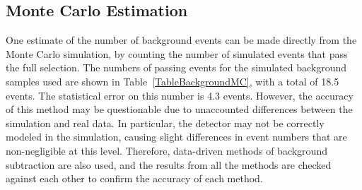 

\subsection{Monte Carlo Estimation}
\label{anMeth:BGSubMC}
One estimate of the number of background events can be made 
directly from the Monte Carlo simulation, 
by counting the number of simulated events that pass 
the full selection.  
The numbers of passing events for the simulated background 
samples used are shown in Table~\ref{TableBackgroundMC}, 
with a total of 18.5 events.  
The statistical error on this number is 4.3 events.  
However, the accuracy of this method may be questionable due to 
unaccounted differences between the simulation and real data. %
In particular, 
the detector may not be correctly modeled in the simulation, 
causing slight differences in event numbers 
that are non-negligible at this level.  
Therefore, data-driven methods of background subtraction 
are also used, 
and the results from all the methods are checked against each other 
to confirm the accuracy of each method.  



